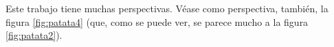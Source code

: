 \graphicspath{{figuras/persp/}}
\label{sec:persp}

Este trabajo tiene muchas perspectivas. Véase como perspectiva, también, la figura \ref{fig:patata4} (que, como se puede ver, se parece mucho a la figura \ref{fig:patata2}).
